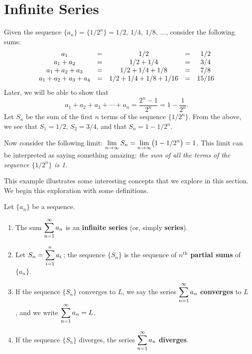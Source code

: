 \section{Infinite Series}\label{sec:series}

Given the sequence $\{a_n\} = \{1/2^n\} = 1/2,\ 1/4,\ 1/8,\ \dotsc$, consider the following sums:\vspace{-.5\baselineskip}
\[
\begin{array}{ c c c c c }
a_1				&=& 1/2					&=& 1/2\\
a_1+a_2			&=& 1/2+1/4				&=& 3/4\\
a_1+a_2+a_3		&=& 1/2+1/4+1/8			&=& 7/8\\
a_1+a_2+a_3+a_4	&=& 1/2+1/4+1/8+1/16		&=& 15/16
\end{array}
\]
Later, we will be able to show that\vspace{-.5\baselineskip}
\[a_1+a_2+a_3+\dotsb+a_n = \frac{2^n-1}{2^n} = 1-\frac{1}{2^n}.\]
Let $S_n$ be the sum of the first $n$ terms of the sequence $\{1/2^n\}$. From the above, we see that $S_1=1/2$, $S_2 = 3/4$, and that $S_n = 1-1/2^n$. 

Now consider the following limit: $\displaystyle \lim_{n\to\infty}S_n = \lim_{n\to\infty}\bigl(1-1/2^n\bigr) = 1$. This limit can be interpreted as saying something amazing: \emph{the sum of \emph{all} the terms of the sequence $\{1/2^n\}$ is 1.} 


This example illustrates some interesting concepts that we explore in this section. We begin this exploration with some definitions.

{
\begin{definition}\label{def:series}%
Let $\{a_n\}$ be a sequence.
\begin{enumerate}
\item		The sum $\displaystyle \sum_{n=1}^\infty a_n$ is an \textbf{infinite series} (or, simply \textbf{series}).
\item		Let $\displaystyle S_n = \sum_{i=1}^n a_i$\,; the sequence $\{S_n\}$ is the sequence of \textbf{$n^{\text{th}}$ partial sums} of $\{a_n\}$.\vspace{-.5\baselineskip}
\item		If the sequence $\{S_n\}$ converges to $L$, we say the series $\displaystyle \sum_{n=1}^\infty a_n$ \textbf{converges} to $L$, and we write $\displaystyle \sum_{n=1}^\infty a_n = L$.\vspace{-.5\baselineskip}
\item		If the sequence $\{S_n\}$ diverges, the series $\displaystyle \sum_{n=1}^\infty a_n$ \textbf{diverges}.
\end{enumerate}
\end{definition}}

